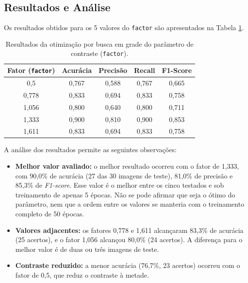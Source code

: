 \subsection{Resultados e Análise}

Os resultados obtidos para os 5 valores do \texttt{factor} são apresentados na Tabela \ref{tab:resultados_grid_search}.

\begin{table}[H]
    \centering
    \caption{\label{tab:resultados_grid_search}Resultados da otimização por busca em grade do parâmetro de contraste (\texttt{factor}).}
    \vspace{0.2cm}
    \begin{tabular}{ccccc}
        \hline
        \textbf{Fator (\texttt{factor})} & \textbf{Acurácia} & \textbf{Precisão} & \textbf{Recall} & \textbf{F1-Score} \\
        \hline
        0,5     & 0,767    & 0,588    & 0,767  & 0,665 \\
        0,778   & 0,833    & 0,694    & 0,833  & 0,758 \\
        1,056   & 0,800    & 0,640    & 0,800  & 0,711 \\
        1,333   & 0,900    & 0,810    & 0,900  & 0,853 \\
        1,611   & 0,833    & 0,694    & 0,833  & 0,758 \\
        \hline
    \end{tabular}
\end{table}

\indent A análise dos resultados permite as seguintes observações:
\begin{itemize}
    \item \textbf{Melhor valor avaliado:} o melhor resultado ocorreu com o fator de 1,333, com 90,0\% de acurácia (27 das 30 imagens de teste), 81,0\% de precisão e 85,3\% de \textit{F1-score}. Esse valor é o melhor entre os cinco testados e sob treinamento de apenas 5 épocas. Não se pode afirmar que seja o ótimo do parâmetro, nem que a ordem entre os valores se manteria com o treinamento completo de 50 épocas.
    \item \textbf{Valores adjacentes:} os fatores 0,778 e 1,611 alcançaram 83,3\% de acurácia (25 acertos), e o fator 1,056 alcançou 80,0\% (24 acertos). A diferença para o melhor valor é de duas ou três imagens de teste.
    \item \textbf{Contraste reduzido:} a menor acurácia (76,7\%, 23 acertos) ocorreu com o fator de 0,5, que reduz o contraste à metade.
\end{itemize}

